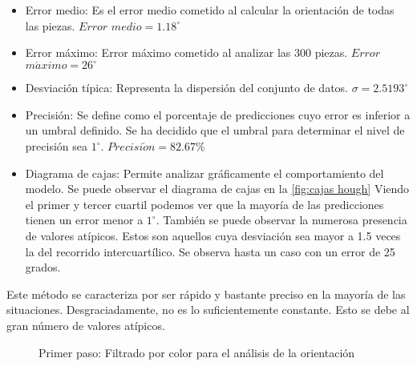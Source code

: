 \begin{itemize}
\item Error medio: Es el error medio cometido al calcular la orientación de todas las piezas. $Error$ $medio = 1.18^{\circ}$
\item Error máximo: Error máximo cometido al analizar las 300 piezas. $Error$ $m \acute{a} ximo = 26^{\circ}$
\item Desviación típica: Representa la dispersión del conjunto de datos. $\sigma = 2.5193^{\circ}$
\item Precisión: Se define como el porcentaje de predicciones cuyo error es inferior a un umbral definido. Se ha decidido que el umbral para determinar el nivel de precisión sea $1^{\circ}$. $Precisi \acute{o} n = 82.67\%$
\item Diagrama de cajas: Permite analizar gráficamente el comportamiento del modelo. Se puede observar el diagrama de cajas en la \autoref{fig:cajas hough} Viendo el primer y tercer cuartil podemos ver que la mayoría de las predicciones tienen un error menor a $1^{\circ}$. También se puede observar la numerosa presencia de valores atípicos. Estos son aquellos cuya desviación sea mayor a 1.5 veces la del recorrido intercuartílico. Se observa hasta un caso con un error de 25 grados.
\end{itemize}

Este método se caracteriza por ser rápido y bastante preciso en la mayoría de las situaciones. Desgraciadamente, no es lo suficientemente constante. Esto se debe al gran número de valores atípicos.

\begin{figure}[ht]  %
  \hfill	
  \hfill	
\caption[Filtrado por color para el análisis de la orientación]{Primer paso: Filtrado por color para el análisis de la orientación}
\label{fig:orientación color}
\vspace{-5pt}
\end{figure}

